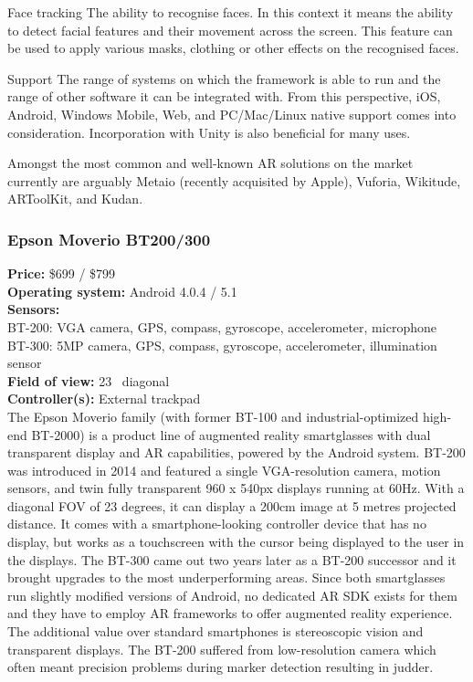 \documentclass[12pt, a4paper]{article}
\newenvironment{definitions}
{\begin{description}[style=nextline]}
{\end{description}}
\begin{document}
\begin{definitions}
\item[Face tracking] The ability to recognise faces. In this context it means the ability to detect facial features and their movement across the screen. This feature can be used to apply various masks, clothing or other effects on the recognised faces.
\item[Support] The range of systems on which the framework is able to run and the range of other software it can be integrated with. From this perspective, iOS, Android, Windows Mobile, Web, and PC/Mac/Linux native support comes into consideration. Incorporation with Unity is also beneficial for many uses.
\end{definitions}


Amongst the most common and well-known AR solutions on the market currently are arguably Metaio (recently acquisited by Apple), Vuforia, Wikitude, ARToolKit, and Kudan.

\subsubsection{Epson Moverio BT200/300}
\vspace*{-5mm}
\textbf{Price:} \$699 / \$799\\
\textbf{Operating system:} Android 4.0.4 / 5.1\\
\textbf{Sensors:} \\
BT-200: VGA camera, GPS, compass, gyroscope, accelerometer, microphone\\
BT-300: 5MP camera, GPS, compass, gyroscope, accelerometer, illumination sensor\\
\textbf{Field of view:} 23\degree~ diagonal\\
\textbf{Controller(s):} External trackpad \bigskip \\
The Epson Moverio family (with former BT-100 and industrial-optimized high-end BT-2000) is a product line of augmented reality smartglasses with dual transparent display and AR capabilities, powered by the Android system. BT-200 was introduced in 2014 and featured a single VGA-resolution camera, motion sensors, and twin fully transparent 960 x 540px displays running at 60Hz. With a diagonal FOV of 23 degrees, it can display a 200cm image at 5 metres projected distance. It comes with a smartphone-looking controller device that has no display, but works as a touchscreen with the cursor being displayed to the user in the displays. The BT-300 came out two years later as a BT-200 successor and it brought upgrades to the most underperforming areas. Since both smartglasses run slightly modified versions of Android, no dedicated AR SDK exists for them and they have to employ AR frameworks to offer augmented reality experience. The additional value over standard smartphones is stereoscopic vision and transparent displays. The BT-200 suffered from low-resolution camera which often meant precision problems during marker detection resulting in judder.
\end{document}
